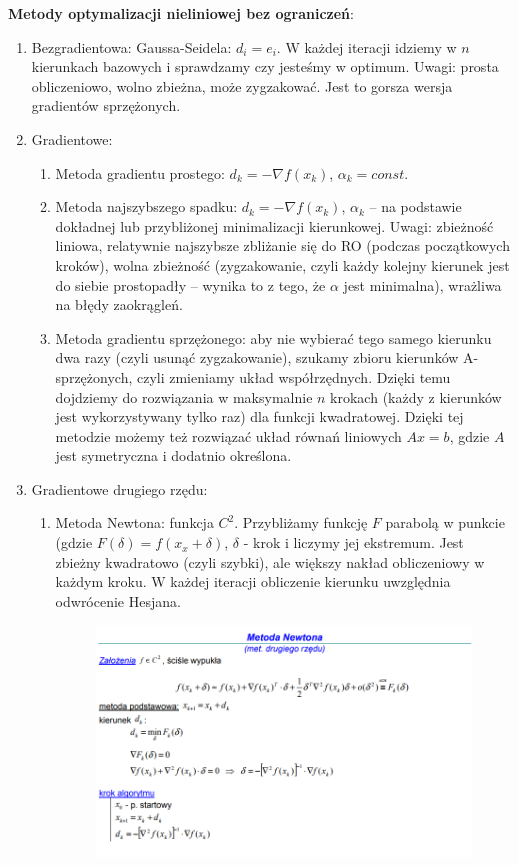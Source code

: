 \documentclass[12pt]{article}
\begin{document}
\textbf{Metody optymalizacji nieliniowej bez ograniczeń}:
\begin{enumerate}
	\item Bezgradientowa: Gaussa-Seidela: $d_{i} = e_{i}$. W każdej iteracji idziemy w $n$ kierunkach bazowych i sprawdzamy czy jesteśmy w optimum. Uwagi: prosta obliczeniowo, wolno zbieżna, może zygzakować. Jest to gorsza wersja gradientów sprzężonych.
	\item Gradientowe:
	\begin{enumerate}
		\item Metoda gradientu prostego: $d_{k} = -\nabla f(x_{k})$, $\alpha _{k} = const$.
		\item Metoda najszybszego spadku: $d_{k} = -\nabla f(x_{k})$, $\alpha _{k}$ -- na podstawie dokładnej lub przybliżonej minimalizacji kierunkowej. Uwagi: zbieżność liniowa, relatywnie najszybsze zbliżanie się do RO (podczas początkowych kroków), wolna zbieżność (zygzakowanie, czyli każdy kolejny kierunek jest do siebie prostopadły -- wynika to z tego, że $\alpha$ jest minimalna), wrażliwa na błędy zaokrągleń.
		\item \label{gradientsprzezony} Metoda gradientu sprzężonego: aby nie wybierać tego samego kierunku dwa razy (czyli usunąć zygzakowanie), szukamy zbioru kierunków A-sprzężonych, czyli zmieniamy układ współrzędnych. Dzięki temu dojdziemy do rozwiązania w maksymalnie $n$ krokach (każdy z kierunków jest wykorzystywany tylko raz) dla funkcji kwadratowej. Dzięki tej metodzie możemy też rozwiązać układ równań liniowych $Ax = b$, gdzie $A$ jest symetryczna i dodatnio określona.
	\end{enumerate}
	\item Gradientowe drugiego rzędu:
	\begin{enumerate}
		\item Metoda Newtona: funkcja $C^{2}$. Przybliżamy funkcję $F$ parabolą w punkcie (gdzie $F(\delta) = f(x_{x} + \delta)$, $\delta$ - krok i liczymy jej ekstremum. Jest zbieżny kwadratowo (czyli szybki), ale większy nakład obliczeniowy w każdym kroku. W każdej iteracji obliczenie kierunku uwzględnia odwrócenie Hesjana.
		\begin{figure}[H]
			\centering
			\includegraphics[scale=0.7]{Pictures/metoda_newtona}

\end{figure}
\end{enumerate}
\end{enumerate}
\end{document}
